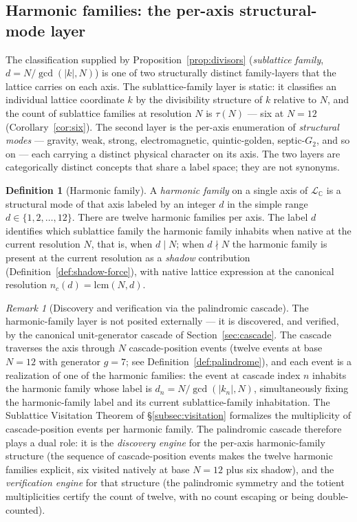 \documentclass[11pt,a4paper]{article}
\theoremstyle{definition}
\newtheorem{definition}[theorem]{Definition}
\theoremstyle{remark}
\newtheorem{remark}[theorem]{Remark}
\begin{document}
\subsection{Harmonic families: the per-axis structural-mode layer}\label{subsec:harmonic-families}

The classification supplied by Proposition~\ref{prop:divisors} (\emph{sublattice family}, $d = N/\gcd(|k|,N)$) is one of two structurally distinct family-layers that the lattice carries on each axis. The sublattice-family layer is static: it classifies an individual lattice coordinate $k$ by the divisibility structure of $k$ relative to $N$, and the count of sublattice families at resolution $N$ is $\tau(N)$ --- six at $N=12$ (Corollary~\ref{cor:six}). The second layer is the per-axis enumeration of \emph{structural modes} --- gravity, weak, strong, electromagnetic, quintic-golden, septic-$G_{2}$, and so on --- each carrying a distinct physical character on its axis. The two layers are categorically distinct concepts that share a label space; they are not synonyms.

\begin{definition}[Harmonic family]\label{def:harmonic-family}
A \emph{harmonic family} on a single axis of $\mathcal{L}_{\mathbb{C}}$ is a structural mode of that axis labeled by an integer $d$ in the simple range $d \in \{1,2,\ldots,12\}$. There are twelve harmonic families per axis. The label $d$ identifies which sublattice family the harmonic family inhabits when native at the current resolution $N$, that is, when $d \mid N$; when $d \nmid N$ the harmonic family is present at the current resolution as a \emph{shadow} contribution (Definition~\ref{def:shadow-force}), with native lattice expression at the canonical resolution $n_{c}(d) = \mathrm{lcm}(N,d)$.
\end{definition}

\begin{remark}[Discovery and verification via the palindromic cascade]\label{rem:cascade-discovery}
The harmonic-family layer is not posited externally --- it is discovered, and verified, by the canonical unit-generator cascade of Section~\ref{sec:cascade}. The cascade traverses the axis through $N$ cascade-position events (twelve events at base $N=12$ with generator $g=7$; see Definition~\ref{def:palindrome}), and each event is a realization of one of the harmonic families: the event at cascade index $n$ inhabits the harmonic family whose label is $d_{n} = N/\gcd(|k_{n}|,N)$, simultaneously fixing the harmonic-family label and its current sublattice-family inhabitation. The Sublattice Visitation Theorem of \S\ref{subsec:visitation} formalizes the multiplicity of cascade-position events per harmonic family. The palindromic cascade therefore plays a dual role: it is the \emph{discovery engine} for the per-axis harmonic-family structure (the sequence of cascade-position events makes the twelve harmonic families explicit, six visited natively at base $N=12$ plus six shadow), and the \emph{verification engine} for that structure (the palindromic symmetry and the totient multiplicities certify the count of twelve, with no count escaping or being double-counted).
\end{remark}
\end{document}
